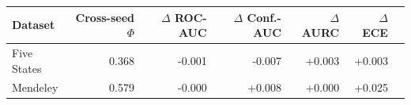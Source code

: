 \begin{tabular}{lrrrrrr}
\toprule
Dataset & Cross-seed $\Phi$ & $\Delta$ ROC-AUC & $\Delta$ Conf.-AUC & $\Delta$ AURC & $\Delta$ ECE \\
\midrule
Five States & 0.368 & -0.001 & -0.007 & +0.003 & +0.003 \\
Mendeley & 0.579 & -0.000 & +0.008 & +0.000 & +0.025 \\
\bottomrule
\end{tabular}
